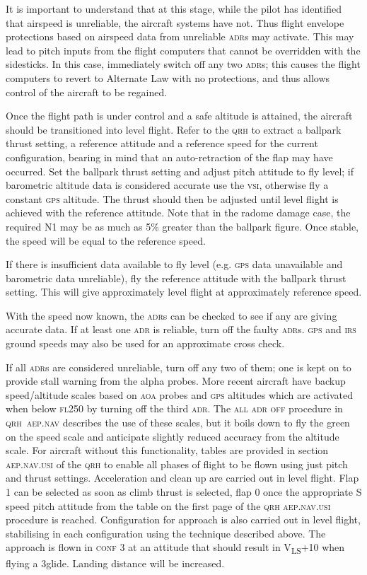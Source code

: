 \documentclass[a5paper,11pt,twoside]{book}
\newcommand{\ac}[1]{{\scshape\MakeLowercase{#1}}}
\newcommand{\inlcite}[1]{{\ac{#1}}}
\newcommand{\V}[1]{V\textsubscript{#1}}
\begin{document}
It is important to understand that at this stage, while the pilot has identified
that airspeed is unreliable, the aircraft systems have not. Thus flight envelope
protections based on airspeed data from unreliable \ac{ADR}s may activate. This
may lead to pitch inputs from the flight computers that cannot be overridden
with the sidesticks. In this case, immediately switch off any two \ac{ADR}s;
this causes the flight computers to revert to Alternate Law with no protections,
and thus allows control of the aircraft to be regained.

Once the flight path is under control and a safe altitude is attained, the
aircraft should be transitioned into level flight. Refer to the \ac{QRH} to
extract a ballpark thrust setting, a reference attitude and a reference speed
for the current configuration, bearing in mind that an auto-retraction of the
flap may have occurred. Set the ballpark thrust setting and adjust pitch
attitude to fly level; if barometric altitude data is considered accurate use
the \ac{VSI}, otherwise fly a constant \ac{GPS} altitude. The thrust should then
be adjusted until level flight is achieved with the reference attitude. Note
that in the radome damage case, the required N1 may be as much as 5\% greater
than the ballpark figure. Once stable, the speed will be equal to the reference
speed.

If there is insufficient data available to fly level (e.g. \ac{GPS} data
unavailable and barometric data unreliable), fly the reference attitude with the
ballpark thrust setting. This will give approximately level flight at
approximately reference speed.

With the speed now known, the \ac{ADR}s can be checked to see if any are giving
accurate data. If at least one \ac{ADR} is reliable, turn off the faulty
\ac{ADR}s. \ac{GPS} and \ac{IRS} ground speeds may also be used for an
approximate cross check.

If all \ac{ADR}s are considered unreliable, turn off any two of them; one is
kept on to provide stall warning from the alpha probes. More recent aircraft
have backup speed/altitude scales based on \ac{AOA} probes and \ac{GPS}
altitudes which are activated when below \ac{FL}250 by turning off the third
\ac{ADR}. The \ac{ALL ADR OFF} procedure in \inlcite{QRH~AEP.NAV} describes the
use of these scales, but it boils down to fly the green on the speed scale and
anticipate slightly reduced accuracy from the altitude scale.  For aircraft
without this functionality, tables are provided in section \inlcite{AEP.NAV.USI}
of the \ac{QRH} to enable all phases of flight to be flown using just pitch and
thrust settings. Acceleration and clean up are carried out in level flight. Flap
1 can be selected as soon as climb thrust is selected, flap 0 once the
appropriate S speed pitch attitude from the table on the first page of the
\ac{QRH} \inlcite{AEP.NAV.USI} procedure is reached. Configuration for approach
is also carried out in level flight, stabilising in each configuration using the
technique described above. The approach is flown in \ac{CONF} 3 at an attitude
that should result in \V{LS}+10 when flying a 3\textdegree{ }glide. Landing
distance will be increased.
\end{document}
